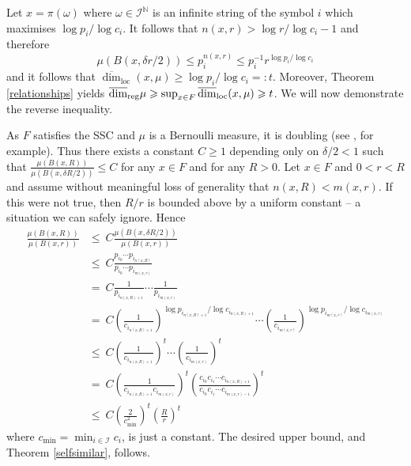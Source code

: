 \documentclass[12pt]{amsart}
\numberwithin{equation}{section}
\renewcommand{\ge}{\geqslant}
\renewcommand{\le}{\leqslant}
\renewcommand{\geq}{\geqslant}
\renewcommand{\leq}{\leqslant}
\renewcommand{\r}{\overline{\dim}_{\textup{reg}} \mu}
\begin{document}
Let $x = \pi(\omega)$ where $\omega \in \mathcal{I}^{\mathbb{N}}$ is an infinite string of the symbol  $i$ which maximises $\log p_i/\log c_i$. It follows that $n(x,r) > \log r / \log {c_i} - 1$ and therefore
\[
\mu(B(x,\delta r/2)) \le p_{i}^{n(x,r)} \leq p_i^{-1} r^{\log p_i/\log c_i}
\]
and it follows that $\overline{\dim}_{\text{loc}}(x,\mu) \geq \log p_i/\log c_i = \colon t$.  Moreover, Theorem \ref{relationships} yields  $ \r  \geq \sup_{x\in F} \overline{\dim}_{\text{loc}}(x,\mu) \ge  t$.  We will now demonstrate the reverse inequality. 





As $F$ satisfies the SSC and $\mu$ is a Bernoulli measure, it is doubling (see \cite{olsenformalism}, for example). Thus there exists a constant $C \geq 1$ depending only on $\delta/2 < 1$ such that $\frac{\mu(B(x, R))}{\mu(B(x,\delta R/2))}\le C$ for any $x\in F$ and for any $R>0$.  Let $x \in F$ and $0<r<R$  and assume without meaningful loss of generality that $n(x,R) < m(x,r)$. If this were not true, then $R/r$ is bounded above by a uniform constant -- a situation we can safely ignore.  Hence
\begin{align*}
\frac{\mu(B(x,R))}{\mu (B(x,r))}& \le \ C \frac{\mu(B(x,\delta R/2))}{\mu (B(x,r))}  \\
& \le \ C \frac{p_{i_0}\cdots p_{i_{n(x,R)}}}{p_{i_0}\cdots p_{i_{m(x,r)}}} \\
& =\  C  \frac{1}{p_{i_{n(x,R)+1}}} \cdots \frac{1}{p_{i_{m(x,r)}}} \\
& = \ C  \left(\frac{1}{c_{i_{n(x,R)+1}}}\right)^{\log p_{i_{n(x,R)+1}}/\log c_{i_{n(x,R)+1}}} \cdots \left(\frac{1}{c_{i_{m(x,r)}}}\right)^{\log p_{i_{m(x,r)}}/\log c_{i_{m(x,r)}}} \\
& \le\  C  \left( \frac{1}{c_{i_{n(x,R)+1}}}\right)^t \cdots \left( \frac{1}{c_{i_{m(x,r)}}}\right)^t \\
& = \ C  \left(\frac{1}{c_{i_{n(x,R)+1}} c_{i_{m(x,r)}}}\right)^t \left( \frac{c_{i_0}c_{i_1} \cdots c_{i_{n(x,R)+1}}}{c_{i_0}c_{i_1} \cdots c_{i_{m(x,r)-1}}}\right)^t \\
& \le \  C   \left(\frac{2}{c_{\min}^2}\right)^t \left( \frac{R}{r}\right)^t
\end{align*}
where $c_{\min} = \min_{i\in \mathcal{I}}c_i$, is just a constant.  The desired upper bound, and Theorem \ref{selfsimilar}, follows.
\end{document}
